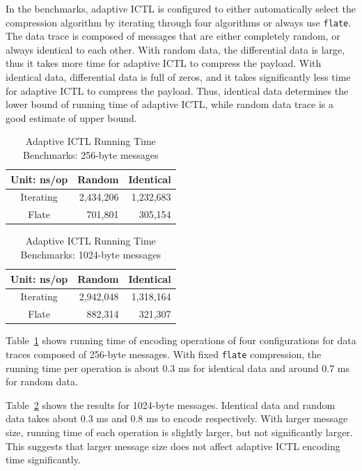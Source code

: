 \documentclass[12pt]{report}
\begin{document}
In the benchmarks, adaptive ICTL is configured to either automatically select the compression algorithm by iterating through four algorithms or always use \texttt{flate}. The data trace is composed of messages that are either completely random, or always identical to each other. With random data, the differential data is large, thus it takes more time for adaptive ICTL to compress the payload. With identical data, differential data is full of zeros, and it takes significantly less time for adaptive ICTL to compress the payload. Thus, identical data determines the lower bound of running time of adaptive ICTL, while random data trace is a good estimate of upper bound.

\begin{table}[h]
  \begin{center}
    \begin{tabular}{|c|r|r|}
      \hline
      Unit: ns/op & Random & Identical \\ \hline
      Iterating   & 2,434,206 & 1,232,683 \\ \hline
      Flate       & 701,801 & 305,154 \\ \hline
    \end{tabular}
    \caption{\label{tab:ictl_time_256}Adaptive ICTL Running Time Benchmarks: 256-byte messages}
  \end{center}
\end{table}

\begin{table}[h]
  \begin{center}
    \begin{tabular}{|c|r|r|}
      \hline
      Unit: ns/op & Random & Identical \\ \hline
      Iterating   & 2,942,048 & 1,318,164 \\ \hline
      Flate       & 882,314 & 321,307 \\ \hline
    \end{tabular}
    \caption{\label{tab:ictl_time_1024}Adaptive ICTL Running Time Benchmarks: 1024-byte messages}
  \end{center}
\end{table}

Table~\ref{tab:ictl_time_256} shows running time of encoding operations of four configurations for data traces composed of 256-byte messages. With fixed \texttt{flate} compression, the running time per operation is about 0.3 ms for identical data and around 0.7 ms for random data.

Table~\ref{tab:ictl_time_1024} shows the results for 1024-byte messages. Identical data and random data takes about 0.3 ms and 0.8 ms to encode respectively. With larger message size, running time of each operation is slightly larger, but not significantly larger. This suggests that larger message size does not affect adaptive ICTL encoding time significantly.
\end{document}
